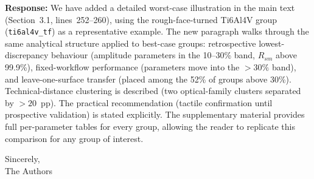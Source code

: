 \documentclass[10pt]{article}
\begin{document}
\begin{enumerate}[leftmargin=*, label=\textbf{Comment \arabic*.}, ref=\arabic*]
\textbf{Response:} We have added a detailed worst-case illustration in the main text (Section~3.1, lines~252--260), using the rough-face-turned Ti6Al4V group (\texttt{ti6al4v\_tf}) as a representative example. The new paragraph walks through the same analytical structure applied to best-case groups: retrospective lowest-discrepancy behaviour (amplitude parameters in the 10--30\% band, $R_{sm}$ above 99.9\%), fixed-workflow performance (parameters move into the $>30\%$ band), and leave-one-surface transfer (placed among the 52\% of groups above 30\%). Technical-distance clustering is described (two optical-family clusters separated by $>20$~pp). The practical recommendation (tactile confirmation until prospective validation) is stated explicitly. The supplementary material provides full per-parameter tables for every group, allowing the reader to replicate this comparison for any group of interest.

\end{enumerate}

\vspace{4mm}
\noindent Sincerely,\\
The Authors
\end{document}
